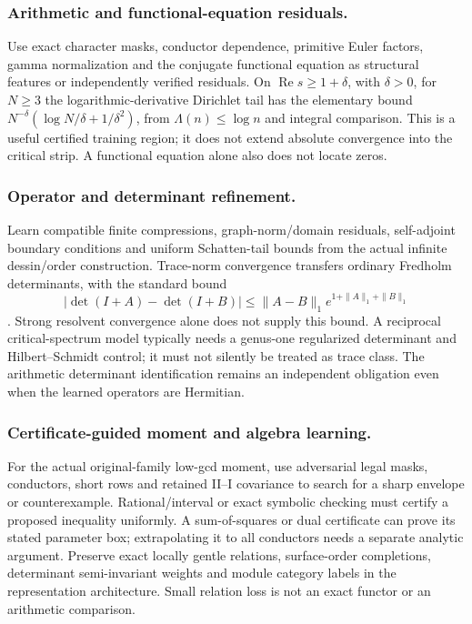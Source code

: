 \documentclass[11pt,oneside,openany]{book}
\theoremstyle{definition}\newtheorem{definition}[theorem]{Definition}
\theoremstyle{remark}\newtheorem{remark}[theorem]{Remark}
\begin{document}
\subsubsection{Arithmetic and functional-equation residuals.}
Use exact character masks, conductor dependence, primitive Euler factors,
gamma normalization and the conjugate functional equation as structural
features or independently verified residuals. On $\operatorname{Re}s\ge1+\delta$,
with $\delta>0$, for $N\ge3$ the logarithmic-derivative Dirichlet tail has the elementary bound
$N^{-\delta}(\log N/\delta+1/\delta^2)$, from
$\Lambda(n)\le\log n$ and integral comparison. This is a useful certified
training region; it does not extend absolute convergence into the critical
strip. A functional equation alone also does not locate zeros.

\subsubsection{Operator and determinant refinement.}
Learn compatible finite compressions, graph-norm/domain residuals,
self-adjoint boundary conditions and uniform Schatten-tail bounds from the
actual infinite dessin/order construction. Trace-norm convergence transfers
ordinary Fredholm determinants, with the standard bound
\[
 |\det(I+A)-\det(I+B)|
 \le\|A-B\|_1e^{1+\|A\|_1+\|B\|_1}
\]
\cite{HLFredholm}. Strong resolvent convergence alone does not supply this
bound. A reciprocal critical-spectrum model typically needs a genus-one
regularized determinant and Hilbert--Schmidt control; it must not silently
be treated as trace class. The arithmetic determinant identification remains
an independent obligation even when the learned operators are Hermitian.

\subsubsection{Certificate-guided moment and algebra learning.}
For the actual original-family low-gcd moment, use adversarial legal masks,
conductors, short rows and retained II--I covariance to search for a sharp
envelope or counterexample. Rational/interval or exact symbolic checking must
certify a proposed inequality uniformly. A sum-of-squares or dual certificate
can prove its stated parameter box; extrapolating it to all conductors needs
a separate analytic argument. Preserve exact locally gentle relations,
surface-order completions, determinant semi-invariant weights and module
category labels in the representation architecture. Small relation loss is
not an exact functor or an arithmetic comparison.
\end{document}
